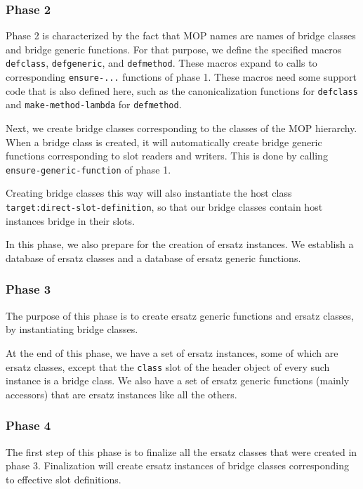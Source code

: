 \subsubsection{Phase 2}

Phase 2 is characterized by the fact that MOP names are names of
bridge classes and bridge generic functions.  For that purpose, we
define the specified macros \texttt{defclass}, \texttt{defgeneric},
and \texttt{defmethod}.  These macros expand to calls to corresponding
\texttt{ensure-...} functions of phase 1.  These macros need some
support code that is also defined here, such as the canonicalization
functions for \texttt{defclass} and \texttt{make-method-lambda} for
\texttt{defmethod}.

Next, we create bridge classes corresponding to the classes of the MOP
hierarchy.  When a bridge class is created, it will automatically
create bridge generic functions corresponding to slot readers and
writers.  This is done by calling \texttt{ensure-generic-function} of
phase 1.

Creating bridge classes this way will also instantiate the host class
\texttt{target:direct-slot-definition}, so that our bridge classes
contain host instances bridge in their slots. 

In this phase, we also prepare for the creation of ersatz instances.
We establish a database of ersatz classes and a database of ersatz
generic functions.


\subsubsection{Phase 3}

The purpose of this phase is to create ersatz generic functions and
ersatz classes, by instantiating bridge classes.  

At the end of this phase, we have a set of ersatz instances, some of
which are ersatz classes, except that the \texttt{class} slot of the
header object of every such instance is a bridge class.  We also have
a set of ersatz generic functions (mainly accessors) that are ersatz
instances like all the others. 

\subsubsection{Phase 4}

The first step of this phase is to finalize all the ersatz classes
that were created in phase 3.  Finalization will create ersatz
instances of bridge classes corresponding to effective slot
definitions. 

